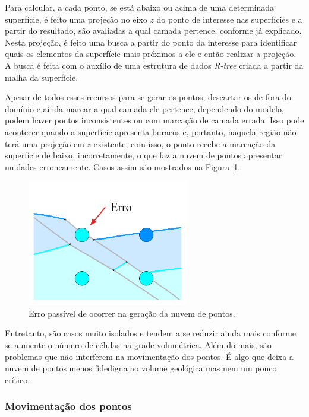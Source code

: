 Para calcular, a cada ponto, se está abaixo ou acima de uma determinada superfície, é feito uma projeção no eixo $z$ do ponto de interesse nas superfícies e a partir do resultado, são avaliadas a qual camada pertence, conforme já explicado. Nesta projeção, é feito uma busca a partir do ponto da interesse para identificar quais os elementos da superfície mais próximos a ele e então realizar a projeção. A busca é feita com o auxílio de uma estrutura de dados \emph{R-tree}\cite{RTree} criada a partir da malha da superfície.

Apesar de todos esses recursos para se gerar os pontos, descartar os de fora do domínio e ainda marcar a qual camada ele pertence, dependendo do modelo, podem haver pontos inconsistentes ou com marcação de camada errada. Isso pode acontecer quando a superfície apresenta buracos e, portanto, naquela região não terá uma projeção em $z$ existente, com isso, o ponto recebe a marcação da superfície de baixo, incorretamente, o que faz a nuvem de pontos apresentar unidades erroneamente. Casos assim são mostrados na Figura~\ref{fig-vol-errors}.

\begin{figure} [H]
  \begin{center}
    \includegraphics[width=200pt]{images/fig-vol-errors}
    \caption{Erro passível de ocorrer na geração da nuvem de pontos.}\label{fig-vol-errors}
  \end{center}
\end{figure}

Entretanto, são casos muito isolados e tendem a se reduzir ainda mais conforme se aumente o número de células na grade volumétrica. Além do mais, são problemas que não interferem na movimentação dos pontos. É algo que deixa a nuvem de pontos menos fidedigna ao volume geológica mas nem um pouco crítico.

\subsubsection{Movimentação dos pontos}

